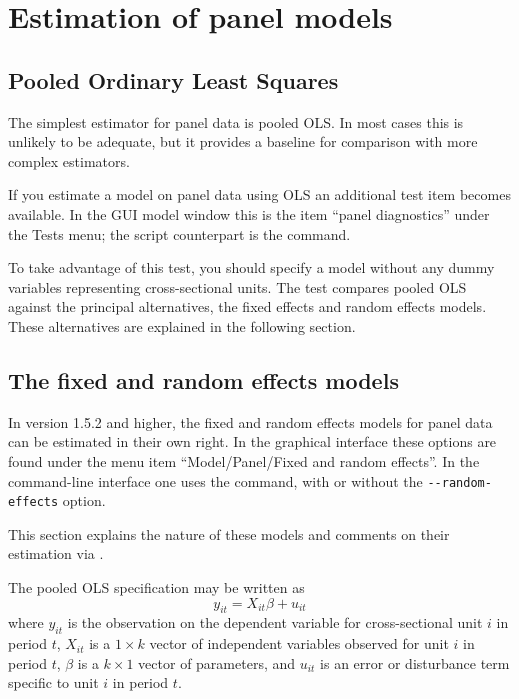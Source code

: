 \section{Estimation of panel models}

\subsection{Pooled Ordinary Least Squares}
\label{pooled-est}

The simplest estimator for panel data is pooled OLS.  In most cases
this is unlikely to be adequate, but it provides a baseline for
comparison with more complex estimators.

If you estimate a model on panel data using OLS an additional test
item becomes available.  In the GUI model window this is the item
``panel diagnostics'' under the \textsf{Tests} menu; the script
counterpart is the  command.

To take advantage of this test, you should specify a model without any
dummy variables representing cross-sectional units.  The test compares
pooled OLS against the principal alternatives, the fixed effects and
random effects models.  These alternatives are explained in the
following section.

\subsection{The fixed and random effects models}
\label{panel-est}

In  version 1.5.2 and higher, the fixed and random effects
models for panel data can be estimated in their own right.  In the
graphical interface these options are found under the menu item
``Model/Panel/Fixed and random effects''.  In the command-line
interface one uses the  command, with or without the
\verb+--random-effects+ option.

This section explains the nature of these models and comments on their
estimation via .

The pooled OLS specification may be written as 
\begin{equation}
\label{eq:pooled}
y_{it} = X_{it}\beta + u_{it}
\end{equation}
where $y_{it}$ is the observation on the dependent variable for
cross-sectional unit $i$ in period $t$, $X_{it}$ is a $1\times k$
vector of independent variables observed for unit $i$ in period $t$,
$\beta$ is a $k\times 1$ vector of parameters, and $u_{it}$ is an error
or disturbance term specific to unit $i$ in period $t$.

